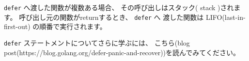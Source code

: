 \texttt{defer} へ渡した関数が複数ある場合、
その呼び出しはスタック( stack )されます。 
呼び出し元の関数がreturnするとき、 \texttt{defer} へ
渡した関数は LIFO(last-in-first-out) の順番で実行されます。

\texttt{defer} ステートメントについてさらに学ぶには、 
こちら(blog post(https:\//\//blog.golang.org\//defer-panic-and-recover))を読んでみてください。
